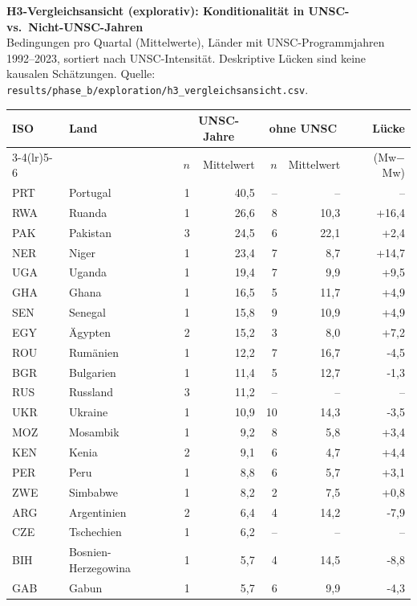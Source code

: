 \documentclass[11pt,a4paper]{article}
\begin{document}
\begin{center}
{\large\bfseries H3-Vergleichsansicht (explorativ): Konditionalit\"at in UNSC- vs.\ Nicht-UNSC-Jahren}\\[2mm]
{\small Bedingungen pro Quartal (Mittelwerte), L\"ander mit UNSC-Programmjahren 1992--2023, sortiert nach UNSC-Intensit\"at.
Deskriptive L\"ucken sind keine kausalen Sch\"atzungen. Quelle: \texttt{results/phase\_b/exploration/h3\_vergleichsansicht.csv}.}
\end{center}
\smallskip
\begin{center}
\small
\begin{tabular}{llrrrrr}
\toprule
ISO & Land & \multicolumn{2}{c}{UNSC-Jahre} & \multicolumn{2}{c}{ohne UNSC} & L\"ucke \\
\cmidrule(lr){3-4}\cmidrule(lr){5-6}
 & & $n$ & Mittelwert & $n$ & Mittelwert & (Mw$-$Mw) \\
\midrule
PRT & Portugal & 1 & 40,5 & -- & -- & -- \\
RWA & Ruanda & 1 & 26,6 & 8 & 10,3 & +16,4 \\
PAK & Pakistan & 3 & 24,5 & 6 & 22,1 & +2,4 \\
NER & Niger & 1 & 23,4 & 7 & 8,7 & +14,7 \\
UGA & Uganda & 1 & 19,4 & 7 & 9,9 & +9,5 \\
GHA & Ghana & 1 & 16,5 & 5 & 11,7 & +4,9 \\
SEN & Senegal & 1 & 15,8 & 9 & 10,9 & +4,9 \\
EGY & \"Agypten & 2 & 15,2 & 3 & 8,0 & +7,2 \\
ROU & Rum\"anien & 1 & 12,2 & 7 & 16,7 & -4,5 \\
BGR & Bulgarien & 1 & 11,4 & 5 & 12,7 & -1,3 \\
RUS & Russland & 3 & 11,2 & -- & -- & -- \\
UKR & Ukraine & 1 & 10,9 & 10 & 14,3 & -3,5 \\
MOZ & Mosambik & 1 & 9,2 & 8 & 5,8 & +3,4 \\
KEN & Kenia & 2 & 9,1 & 6 & 4,7 & +4,4 \\
PER & Peru & 1 & 8,8 & 6 & 5,7 & +3,1 \\
ZWE & Simbabwe & 1 & 8,2 & 2 & 7,5 & +0,8 \\
ARG & Argentinien & 2 & 6,4 & 4 & 14,2 & -7,9 \\
CZE & Tschechien & 1 & 6,2 & -- & -- & -- \\
BIH & Bosnien-Herzegowina & 1 & 5,7 & 4 & 14,5 & -8,8 \\
GAB & Gabun & 1 & 5,7 & 6 & 9,9 & -4,3 \\

\end{tabular}
\end{center}
\end{document}
